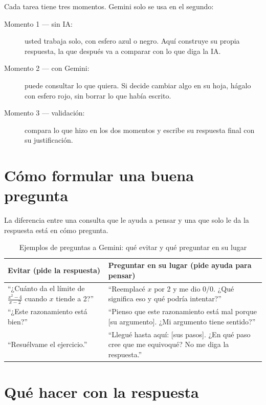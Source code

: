 Cada tarea tiene tres momentos. Gemini solo se usa en el segundo:

\begin{description}
\item[Momento 1 --- sin IA:] usted trabaja solo, con esfero azul o negro. Aquí construye su propia respuesta, la que después va a comparar con lo que diga la IA.
\item[Momento 2 --- con Gemini:] puede consultar lo que quiera. Si decide cambiar algo en su hoja, hágalo con esfero rojo, sin borrar lo que había escrito.
\item[Momento 3 --- validación:] compara lo que hizo en los dos momentos y escribe su respuesta final con su justificación.
\end{description}

\section*{Cómo formular una buena pregunta}

La diferencia entre una consulta que le ayuda a pensar y una que solo le da la respuesta está en cómo pregunta.

\begin{table}[H]
\centering
\caption{Ejemplos de preguntas a Gemini: qué evitar y qué preguntar en su lugar}
\small
\begin{tabular}{|p{6.8cm}|p{6.8cm}|}
\hline
\textbf{Evitar (pide la respuesta)} & \textbf{Preguntar en su lugar (pide ayuda para pensar)} \\
\hline
``¿Cuánto da el límite de $\frac{x^2-4}{x-2}$ cuando $x$ tiende a 2?'' &
``Reemplacé $x$ por 2 y me dio $0/0$. ¿Qué significa eso y qué podría intentar?'' \\
\hline
``¿Este razonamiento está bien?'' &
``Pienso que este razonamiento está mal porque [su argumento]. ¿Mi argumento tiene sentido?'' \\
\hline
``Resuélvame el ejercicio.'' &
``Llegué hasta aquí: [sus pasos]. ¿En qué paso cree que me equivoqué? No me diga la respuesta.'' \\
\hline
\end{tabular}
\end{table}

\section*{Qué hacer con la respuesta}


